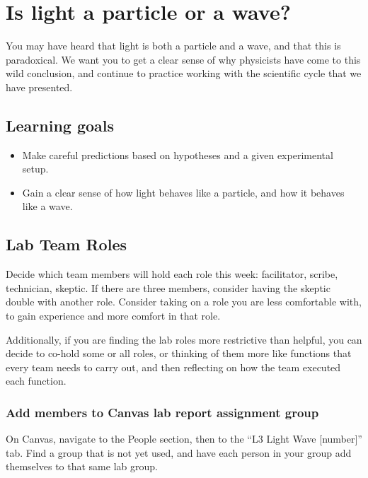 \chapter{Is light a particle or a wave?}

You may have heard that light is both a particle and a wave, and that this is paradoxical. We want you to get a clear sense of why physicists have come to this wild conclusion, and continue to practice working with the scientific cycle that we have presented.

\section{Learning goals}

\begin{itemize}
	\item Make careful predictions based on hypotheses and a given experimental setup.
	
	\item Gain a clear sense of how light behaves like a particle, and how it behaves like a wave.
\end{itemize}

\section{Lab Team Roles}

Decide which team members will hold each role this week: facilitator, scribe, technician, skeptic. If there are three members, consider having the skeptic double with another role. Consider taking on a role you are less comfortable with, to gain experience and more comfort in that role.

Additionally, if you are finding the lab roles more restrictive than helpful, you can decide to co-hold some or all roles, or thinking of them more like functions that every team needs to carry out, and then reflecting on how the team executed each function.

\subsection{Add members to Canvas lab report assignment group}

\begin{steps}
	\item On Canvas, navigate to the People section, then to the ``L3 Light Wave [number]'' tab. Find a group that is not yet used, and have each person in your group add themselves to that same lab group.
\end{steps}

